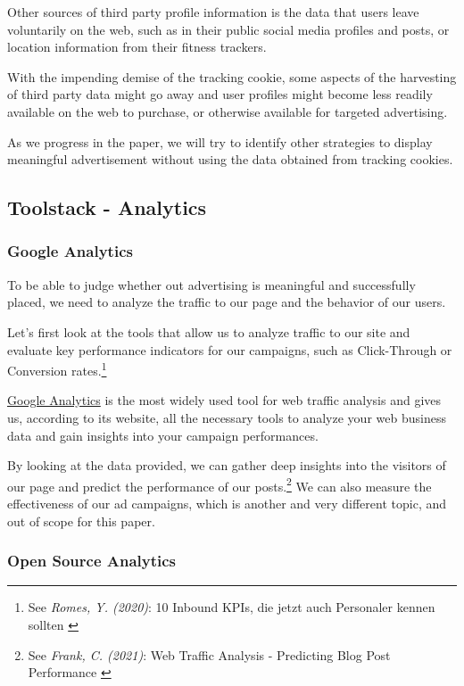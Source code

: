 Other sources of third party profile information is the data that users leave voluntarily on the web, such as in their public social media profiles and posts, or location information from their fitness trackers.

With the impending demise of the tracking cookie, some aspects of the harvesting of third party data might go away and user profiles might become less readily available on the web to purchase, or otherwise available for targeted advertising.

As we progress in the paper, we will try to identify other strategies to display meaningful advertisement without using the data obtained from tracking cookies.

\subsection{Toolstack - Analytics}

\subsubsection{Google Analytics}

To be able to judge whether out advertising is meaningful and successfully placed, we need to analyze the traffic to our page and the behavior of our users.

Let's first look at the tools that allow us to analyze traffic to our site and evaluate key performance indicators for our campaigns, such as Click-Through or Conversion rates.\footnote{See \textit{Romes, Y. (2020)}: 10 Inbound KPIs, die jetzt auch Personaler kennen sollten \cite{inboundKPI}}

\href{https://analytics.google.com/}{Google Analytics} is the most widely used tool for web traffic analysis and gives us, according to its website, all the necessary tools to analyze your web business data and gain insights into your campaign performances.

By looking at the data provided, we can gather deep insights into the visitors of our page and predict the performance of our posts.\footnote{See \textit{Frank, C. (2021)}: Web Traffic Analysis - Predicting Blog Post Performance \cite{previousBigdata}} We can also measure the effectiveness of our ad campaigns, which is another and very different topic, and out of scope for this paper.

\subsubsection{Open Source Analytics}

